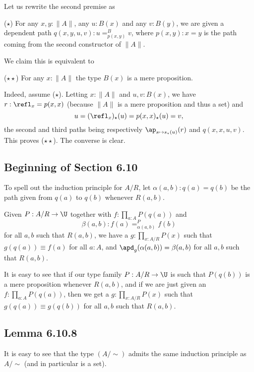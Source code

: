 \documentclass[12pt]{article}
\begin{document}
Let us rewrite the second premise as

\nn($\star$) For any $x,y:\lVert A\rVert$, any $u:B(x)$ and any $v:B(y)$, we are given a dependent path $q(x,y,u,v):u=^B_{p(x,y)}v$, where $p(x,y):x=y$ is the path coming from the second constructor of $\lVert A\rVert$.

We claim this is equivalent to 

\nn($\star\star$) For any $x:\lVert A\rVert$ the type $B(x)$ is a mere proposition.

Indeed, assume ($\star$). Letting $x:\lVert A\rVert$ and $u,v:B(x)$, we have $r:\refl_x=p(x,x)$ (because $\lVert A\rVert$ is a mere proposition and thus a set) and 
$$
u=(\refl_x)_\star(u)=p(x,x)_\star(u)=v,
$$ 
the second and third paths being respectively $\ap_{s\mapsto s_\star(u)}(r)$ and $q(x,x,u,v)$. This proves ($\star\star$). The converse is clear.


\subsection{Beginning of Section 6.10}

To spell out the induction principle for $A/R$, let $\alpha(a,b):q(a)=q(b)$ be the path given from $q(a)$ to $q(b)$ whenever $R(a,b)$. 

Given $P:A/R\to\U$ together with $f:\prod_{a:A}P(q(a))$ and 
$$
\beta(a,b):f(a)=^P_{\alpha(a,b)}f(b)
$$ 
for all $a,b$ such that $R(a,b)$, we have a $g:\prod_{x:A/R}P(x)$ such that $g(q(a))\equiv f(a)$ for all $a:A$, and $\apd_g(\alpha(a,b))=\beta(a,b)$ for all $a,b$ such that $R(a,b)$.

It is easy to see that if our type family $P:A/R\to\U$ is such that $P(q(b))$ is a mere proposition whenever $R(a,b)$, and if we are just given an $f:\prod_{a:A}P(q(a))$, then we get a $g:\prod_{x:A/R}P(x)$ such that $g(q(a))\equiv g(q(b))$ for all $a,b$ such that $R(a,b)$.


\subsection{Lemma 6.10.8}


It is easy to see that the type $(A/\sim)$ admits the same induction principle as $A/\sim$ (and in particular is a set).
\end{document}
